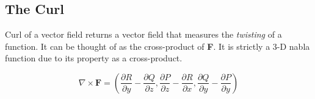 \documentclass[a4paper, 11pt]{article}
\begin{document}
\subsection{The Curl}
Curl of a vector field returns a vector field that measures the \emph{twisting} of a function. It can be thought of as the cross-product of \textbf{F}. It is strictly a 3-D nabla function due to its property as a cross-product.

\[
    \nabla \times \mathbf{F} = \left( \frac{\partial{R}}{\partial{y}} - \frac{\partial{Q}}{\partial{z}}, \frac{\partial{P}}{\partial{z}} - \frac{\partial{R}}{\partial{x}}, \frac{\partial{Q}}{\partial{y}} - \frac{\partial{P}}{\partial{y}}\right)
\]
\end{document}
